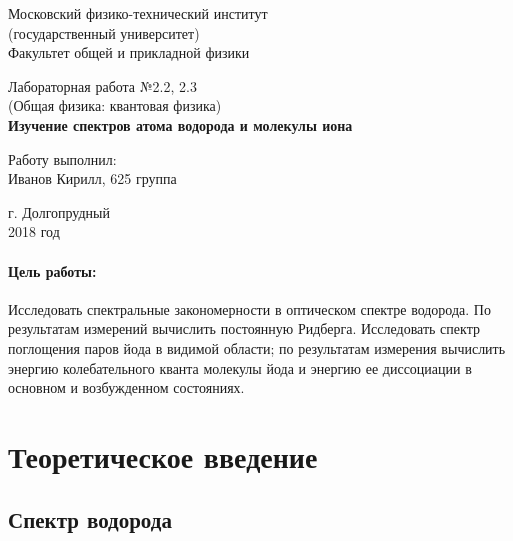 \documentclass[12pt]{kiarticle} %
\begin{document}
	
	\begin{titlepage}
		\begin{center}
			\large 	Московский физико-технический институт \\
			(государственный университет) \\
			Факультет общей и прикладной физики \\
			\vspace{0.2cm}
			
			\vspace{4.5cm}
			Лабораторная работа №2.2, 2.3  \\ \vspace{0.2cm}
			\large (Общая физика: квантовая физика) \\ \vspace{0.2cm}
			\LARGE \textbf{ Изучение спектров атома водорода и молекулы иона }
		\end{center}
		\vspace{2.3cm} \large
		
		\begin{center}
			Работу выполнил: \\
			Иванов Кирилл,
			625 группа
			\vspace{10mm}		
			
		\end{center}
		
		\begin{center} \vspace{60mm}
			г. Долгопрудный \\
			2018 год
		\end{center}
	\end{titlepage}


	\paragraph*{Цель работы:}  
	
	Исследовать спектральные закономерности в оптическом спектре водорода. По результатам измерений вычислить постоянную Ридберга. Исследовать спектр поглощения паров йода в видимой области; по результатам измерения вычислить энергию колебательного кванта молекулы йода и энергию ее диссоциации в основном и возбужденном состояниях.
	
	
	\section{Теоретическое введение}
	
	\subsection{Спектр водорода}
	
\end{document}
